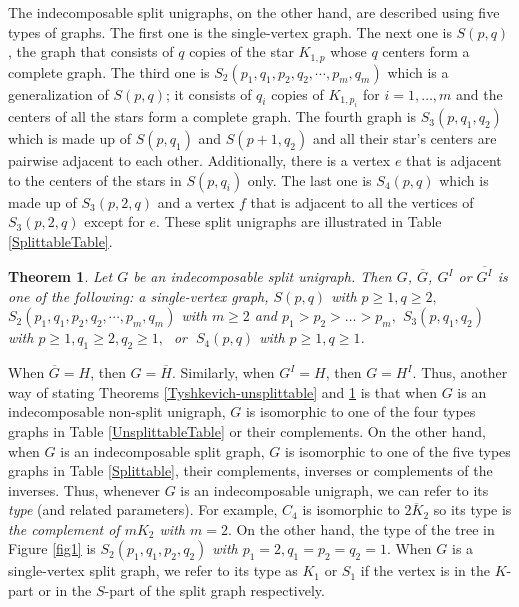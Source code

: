 \documentclass[11pt]{article}
\newtheorem{theorem}[df]{Theorem}
\begin{document}
 

 The indecomposable split unigraphs, on the other hand, are described using five types of graphs.  The first one is the single-vertex graph.   The next one is $S(p,q)$, the graph that consists of $q$ copies of the star $K_{1,p}$ whose $q$ centers form a complete graph.  The third one is $S_2(p_1, q_1, p_2, q_2, \cdots, p_m, q_m)$ which  is a generalization of $S(p,q)$; it consists of $q_i$ copies of $K_{1, p_i}$ for $i = 1, \hdots, m$ and the centers of all the stars form a complete graph.   The fourth graph is $S_3(p, q_1, q_2)$ which is made up of $S(p, q_1)$ and $S(p+1, q_2)$ and all their star's centers are pairwise adjacent to each other.  Additionally, there is a vertex $e$ that is adjacent to the centers of the stars in $S(p, q_i)$ only.    The last one is $S_4(p,q)$ which is made up of $S_3(p, 2, q)$ and a vertex $f$ that is adjacent to all the vertices of $S_3(p,2,q)$ except for $e$.  These split unigraphs are illustrated in Table \ref{SplittableTable}.  

 
 \begin{theorem}
 {\bf \cite{Ty00}} Let $G$ be an indecomposable split unigraph.  Then $G$,  $\overline{G}$, $G^I$ or $\overline{G^I}$ is one of the following: 
a single-vertex graph,  $S(p,q)$ with $p \ge 1, q \ge 2, $  $ S_2(p_1, q_1, p_2, q_2, \cdots, p_m, q_m)$ with $m \ge 2$ and $p_1 > p_2 > \hdots > p_m,$   $ S_3(p, q_1, q_2)$ with $p \ge 1, q_1 \ge 2, q_2 \ge 1, \;$  or $\;S_4(p,q)$ with $p \ge 1, q \ge 1$.
  \label{Tyshkevich-splittable}

 \end{theorem}
 
 

When $\overline{G} = H$, then $G = \overline{H}$.  Similarly, when $G^I = H$, then $G = H^I$.  Thus, another way of stating Theorems \ref{Tyshkevich-unsplittable} and \ref{Tyshkevich-splittable} is that when $G$ is an indecomposable non-split unigraph,  $G$ is isomorphic to one of the four types graphs in Table \ref{UnsplittableTable} or their complements.  On the other hand,  when $G$ is an indecomposable split graph, $G$ is isomorphic to one of the five types graphs in Table \ref{Splittable}, their complements, inverses or complements of the inverses.  Thus, whenever $G$ is an indecomposable unigraph, we can refer to its {\it type} (and related parameters). For example,  $C_4$  is  isomorphic to $\overline{2K_2}$ so its type is {\it the complement of $mK_2$ with $m = 2$}.  On the other hand, the type of the tree in Figure \ref{fig1} is {\it $S_2(p_1, q_1, p_2, q_2)$ with $p_1 = 2, q_1 = p_2 = q_2 = 1$}.  When $G$ is a single-vertex split graph, we refer to its type as $K_1$ or $S_1$ if the vertex is in the $K$-part or in the $S$-part of the split graph respectively.
\end{document}
